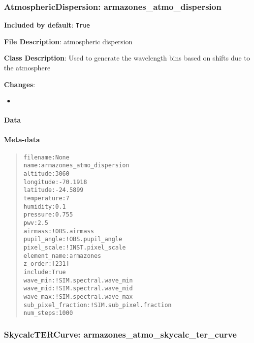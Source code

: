 \subsubsection{AtmosphericDispersion: \textquotedbl{}armazones\_atmo\_dispersion\textquotedbl{}%
  \label{atmosphericdispersion-armazones-atmo-dispersion}%
}

\textbf{Included by default}: \texttt{True}

\textbf{File Description}: atmospheric dispersion

\textbf{Class Description}: Used to generate the wavelength bins based on shifts due to the atmosphere

\textbf{Changes}:

\begin{itemize}
\item \end{itemize}


\paragraph{Data%
  \label{id1}%
}


\paragraph{Meta-data%
  \label{id2}%
}

\begin{quote}
\begin{alltt}
          filename : None
              name : armazones_atmo_dispersion
          altitude : 3060
         longitude : -70.1918
          latitude : -24.5899
       temperature : 7
          humidity : 0.1
          pressure : 0.755
               pwv : 2.5
           airmass : !OBS.airmass
       pupil_angle : !OBS.pupil_angle
       pixel_scale : !INST.pixel_scale
      element_name : armazones
           z_order : [231]
           include : True
          wave_min : !SIM.spectral.wave_min
          wave_mid : !SIM.spectral.wave_mid
          wave_max : !SIM.spectral.wave_max
sub_pixel_fraction : !SIM.sub_pixel.fraction
         num_steps : 1000
\end{alltt}
\end{quote}


\subsubsection{SkycalcTERCurve: \textquotedbl{}armazones\_atmo\_skycalc\_ter\_curve\textquotedbl{}%
  \label{skycalctercurve-armazones-atmo-skycalc-ter-curve}%
}

